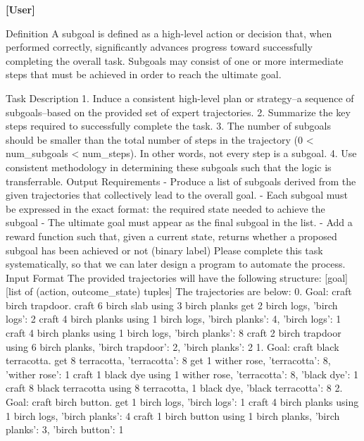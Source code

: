 
\textbf{[User]}
\begin{UserTurn}
Definition
A subgoal is defined as a high-level action or decision that, when performed correctly, significantly advances progress toward successfully completing the overall task. Subgoals may consist of one or more intermediate steps that must be achieved in order to reach the ultimate goal.

Task Description
1. Induce a consistent high-level plan or strategy--a sequence of subgoals--based on the provided set of expert trajectories.
2. Summarize the key steps required to successfully complete the task.
3. The number of subgoals should be smaller than the total number of steps in the trajectory (0 < num_subgoals < num_steps). In other words, not every step is a subgoal.
4. Use consistent methodology in determining these subgoals such that the logic is transferrable.
Output Requirements
- Produce a list of subgoals derived from the given trajectories that collectively lead to the overall goal.
- Each subgoal must be expressed in the exact format:
  the required state needed to achieve the subgoal
- The ultimate goal must appear as the final subgoal in the list.
- Add a reward function such that, given a current state, returns whether a proposed subgoal has been achieved or not (binary label)
Please complete this task systematically, so that we can later design a program to automate the process.
Input Format
The provided trajectories will have the following structure:
[goal]
[list of (action, outcome_state) tuples]
The trajectories are below:
0.
Goal: craft birch trapdoor.
craft 6 birch slab using 3 birch planks
get 2 birch logs, {'birch logs': 2}
craft 4 birch planks using 1 birch logs, {'birch planks': 4, 'birch logs': 1}
craft 4 birch planks using 1 birch logs, {'birch planks': 8}
craft 2 birch trapdoor using 6 birch planks, {'birch trapdoor': 2, 'birch planks': 2}
1.
Goal: craft black terracotta.
get 8 terracotta, {'terracotta': 8}
get 1 wither rose, {'terracotta': 8, 'wither rose': 1}
craft 1 black dye using 1 wither rose, {'terracotta': 8, 'black dye': 1}
craft 8 black terracotta using 8 terracotta, 1 black dye, {'black terracotta': 8}
2.
Goal: craft birch button.
get 1 birch logs, {'birch logs': 1}
craft 4 birch planks using 1 birch logs, {'birch planks': 4}
craft 1 birch button using 1 birch planks, {'birch planks': 3, 'birch button': 1}

\end{UserTurn}
